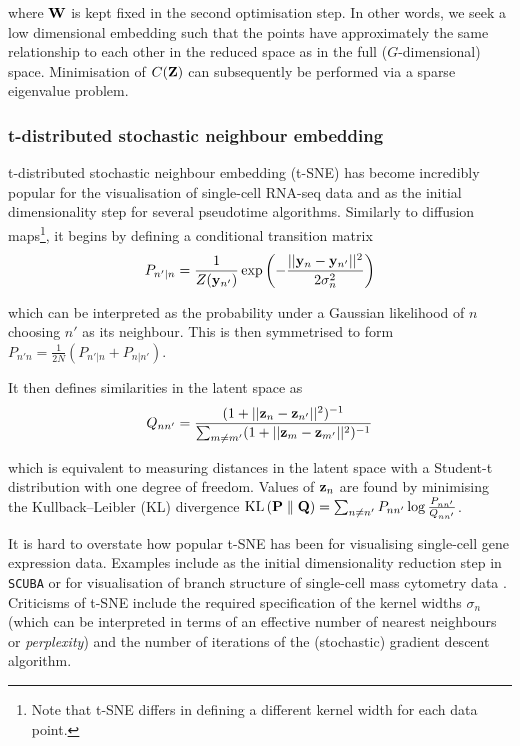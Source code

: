 where $\mathbf{W}$ is kept fixed in the second optimisation step. In other words, we seek a low dimensional embedding such that the points have approximately the same relationship to each other in the reduced space as in the full ($G$-dimensional) space. Minimisation of $C(\mathbf{Z})$ can subsequently be performed via a sparse eigenvalue problem.

\subsubsection{t-distributed stochastic neighbour embedding} \label{sec:tsne}

t-distributed stochastic neighbour embedding (t-SNE) \cite{maaten2008visualizing} has become incredibly popular for the visualisation of single-cell RNA-seq data and as the initial dimensionality step for several pseudotime algorithms. Similarly to diffusion maps\footnote{
Note that t-SNE differs in defining a different kernel width for each data point.
}, it begins by defining a conditional transition matrix
\begin{equation}
  P_{n'|n} = \frac{1}{Z(\mathbf{y}_{n'})} \exp\left( - \frac{\lvert \lvert \mathbf{y}_n - \mathbf{y}_{n'} \rvert \rvert^2}{2 \sigma_n^2}\right)
\end{equation}

which can be interpreted as the probability under a Gaussian likelihood of $n$ choosing $n'$ as its neighbour. This is then symmetrised to form $P_{n'n} = \frac{1}{2N}(  P_{n'|n} +   P_{n|n'})$.

It then defines similarities in the latent space as
\begin{equation}
  Q_{nn'} = \frac{
  (1 + \lvert \lvert \mathbf{z}_n - \mathbf{z}_{n'} \rvert \rvert^2)^{-1}
  }{
  \sum_{m \neq m'} (1 + \lvert \lvert \mathbf{z}_m - \mathbf{z}_{m'} \rvert \rvert^2)^{-1}
  }
\end{equation}

which is equivalent to measuring distances in the latent space with a Student-t distribution with one degree of freedom. Values of $\mathbf{z}_n$ are found by minimising the Kullback–Leibler (KL) divergence
$\textrm{KL}\left(\mathbf{P}\;\|\;\mathbf{Q}\right) = \sum_{n \neq n'} P_{nn'} \log \frac{P_{nn'}}{Q_{nn'}}$.

It is hard to overstate how popular t-SNE has been for visualising single-cell gene expression data. Examples include as the initial dimensionality reduction step in \texttt{SCUBA} \cite{marco2014bifurcation} or for visualisation of branch structure of single-cell mass cytometry data \cite{setty2016wishbone}. Criticisms of t-SNE include the required specification of the kernel widths $\sigma_n$ (which can be interpreted in terms of an effective number of nearest neighbours or \emph{perplexity}) and the number of iterations of the (stochastic) gradient descent algorithm.


